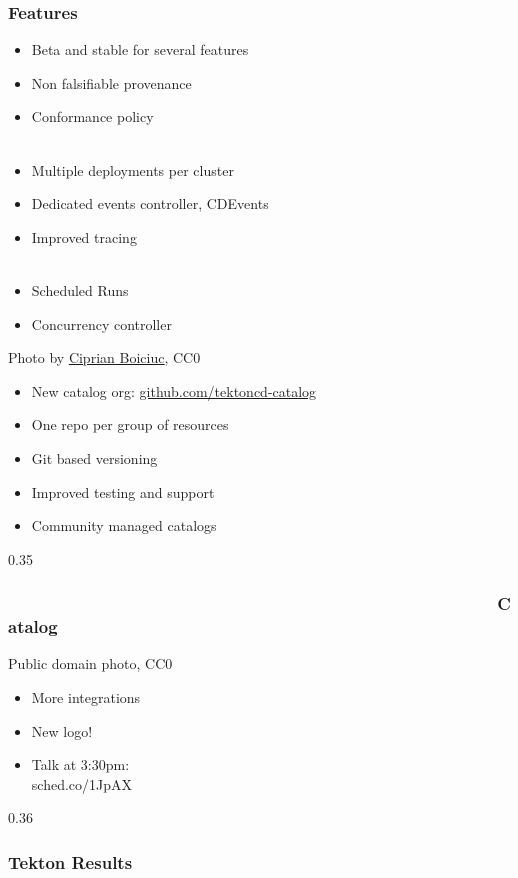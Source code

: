 \documentclass[aspectratio=169,11pt,hyperref={colorlinks=true}]{beamer}
\begin{document}
\begin{blackframe}
  \frametitle{Features}
  \begin{itemize}
    \item Beta and stable for several features
    \item Non falsifiable provenance
    \item Conformance policy\\~
    \item Multiple deployments per cluster
    \item Dedicated events controller, CDEvents
    \item Improved tracing\\~
    \item Scheduled Runs
    \item Concurrency controller
  \end{itemize}
\end{blackframe}

\begin{lpicrblack}{%
  Photo by \href{https://unsplash.com/@ciprian}{\underline{Ciprian Boiciuc}}, CC0
  }%
  {%
  \begin{itemize}
    \item New catalog org: \href{https://github.com/tektoncd-catalog}{github.com/tektoncd-catalog}
    \item One repo per group of resources
    \item Git based versioning
    \item Improved testing and support
    \item Community managed catalogs
  \end{itemize}
  }%
  {0.35}
  \frametitle{~~~~~~~~~~~~~~~~~~~~~~~~~~~~~~~~~~~~~~~~~~~~~~~~~~~~Catalog}
\end{lpicrblack}

\begin{lgrayframerpic}{Public domain photo, CC0}%
  {%
  \begin{itemize}
    \item More integrations
    \item New logo!
    \item Talk at 3:30pm:\\sched.co/1JpAX
  \end{itemize}
  }%
  {0.36}
  \frametitle{Tekton Results}
\end{lgrayframerpic}
\end{document}
